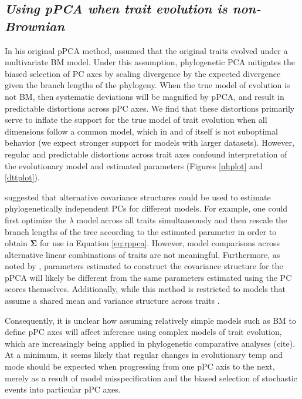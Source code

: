 \documentclass[a4paper,12pt]{article}
\begin{document}
\subsection{\emph{Using pPCA when trait evolution is non-Brownian}}
In his original pPCA method, \citet{Revell2008} assumed that the original traits evolved under a multivariate BM model. Under this assumption, phylogenetic PCA mitigates the biased selection of PC axes by scaling divergence by the expected divergence given the branch lengths of the phylogeny. When the true model of evolution is not BM, then systematic deviations will be magnified by pPCA, and result in predictable distortions across pPC axes. We find that these distortions primarily serve to inflate the support for the true model of trait evolution when all dimensions follow a common model, which in and of itself is not suboptimal behavior (we expect stronger support for models with larger datasets). However, regular and predictable distortions across trait axes confound interpretation of the evolutionary model and estimated parameters (Figures \ref{nhplot} and \ref{dttplot}). 

\cite{Revell2008} suggested that alternative covariance structures could be used to estimate phylogenetically independent PCs for different models. For example, one could first optimize the $\lambda$ model \citep{Pagel1999} across all traits simultaneously \citep[using the method of][]{Freckleton2002} and then rescale the branch lengths of the tree according to the estimated parameter in order to obtain $\mathbf{\Sigma}$ for use in Equation \ref{eq:rppca}. However, model comparisons across alternative linear combinations of traits are not meaningful.  Furthermore, as noted by \citet{Revell2008}, parameters estimated to construct the covariance structure for the pPCA will likely be different from the same parameters estimated using the PC scores themselves. Additionally, while this method is restricted to models that assume a shared mean and variance structure across traits \citep[see][for examples where this does not  apply]{Hansen2008, Bartoszek2012}. 

Consequently, it is unclear how assuming relatively simple models such as BM to define pPC axes will affect inference using complex models of trait evolution, which are increasingly being applied in phylogenetic comparative analyses (cite). At a minimum, it seems likely that regular changes in evolutionary temp and mode should be expected when progressing from one pPC axis to the next, merely as a result of model misspecification and the biased selection of stochastic events into particular pPC axes.   
\end{document}

